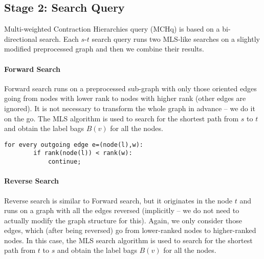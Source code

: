 
\subsection{Stage 2: Search Query}
\label{subsecStage2}

Multi-weighted Contraction Hierarchies query (MCHq) is based on a bi-directional search.
Each $s$-$t$ search query runs two MLS-like searches on a slightly modified preprocessed graph
and then we combine their results. 

\paragraph*{Forward Search}
Forward search runs on a preprocessed sub-graph with only those oriented edges going from nodes with lower rank to nodes with higher rank (other edges are ignored). It is not necessary to transform the whole graph in advance -- we do it on the go. 
The MLS algorithm is used to search for the shortest path from $s$ to $t$ and obtain the label bags $B(v)$ for all the nodes.

\begin{lstlisting}[caption={Line X of MLS for Forward Search},label=list:8-6,captionpos=t,float,abovecaptionskip=-\medskipamount]
    for every outgoing edge e=(node(l),w):
    	if rank(node(l)) < rank(w):
        	continue;
\end{lstlisting}

\paragraph*{Reverse Search}
Reverse search is similar to Forward search, but it originates in the node $t$ and runs on a graph with all the edges reversed (implicitly -- we do not need to actually modify the graph structure for this). Again, we only consider those edges, which (after being reversed) go from lower-ranked nodes to higher-ranked nodes. 
In this case, the MLS search algorithm is used to search for the shortest path from $t$ to $s$ and obtain the label bags $B(v)$ for all the nodes.

